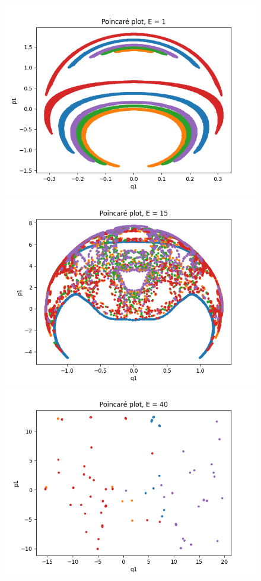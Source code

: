 \documentclass[a4paper,12pt]{article}
\begin{document}
\begin{figure}[!ht]
  \centering
  \begin{minipage}{0.4\textwidth}
    \includegraphics[width=\textwidth]{img/poincare-1.png}
  \end{minipage}
  \begin{minipage}{0.4\textwidth}
    \includegraphics[width=\textwidth]{img/poincare-15.png}
  \end{minipage}
  \includegraphics[scale=0.4]{img/poincare-40.png}
\end{figure}
\end{document}
